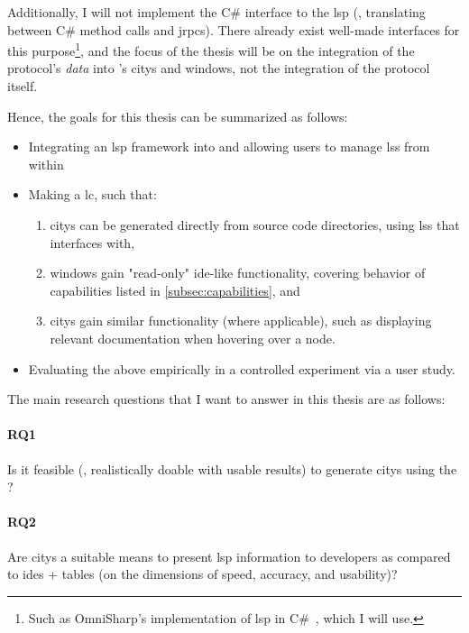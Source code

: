 \documentclass[../thesis]{subfiles}
\begin{document}
Additionally, I will not implement the C\# interface to the \gls{lsp} (\ie, translating between C\# method calls and \glspl{jrpc}).
There already exist well-made interfaces for this purpose\footnote{
	Such as OmniSharp's implementation of \gls{lsp} in C\#~\cite{csharplanguageserverprotocol2025}, which I will use.
}, and the focus of the thesis will be on the integration of the protocol's \emph{data} into \SEE{}'s \glspl{city} and \glspl{window}, not the integration of the protocol itself.

Hence, the goals for this thesis can be summarized as follows:
\begin{itemize}
	\item Integrating an \gls{lsp} framework into \SEE{} and allowing users to manage \glspl{ls} from within \SEE{}
	\item Making \SEE{} a \gls{lc}, such that:
	      \begin{enumerate}
		      \item \Glspl{city} can be generated directly from source code directories, using \glspl{ls} that \SEE{} interfaces with,
		      \item \Glspl{window} gain "read-only" \gls{ide}-like functionality, covering behavior of capabilities listed in \cref{subsec:capabilities}, and
		      \item \Glspl{city} gain similar functionality (where applicable), such as displaying relevant documentation when hovering over a node.
	      \end{enumerate}
	\item Evaluating the above empirically in a controlled experiment via a user study.
\end{itemize}

The main research questions that I want to answer in this thesis are as follows:
\vspace{-1.5em}
\paragraph{RQ1}
Is it feasible (\ie, realistically doable with usable results) to generate \mbox{\glspl{city}} using the \mbox{}?
\vspace{-1.5em}
\paragraph{RQ2}
Are \glspl{city} a suitable means to present \gls{lsp} information to developers as compared to \glspl{ide} + tables (on the dimensions of speed, accuracy, and usability)?
\end{document}
